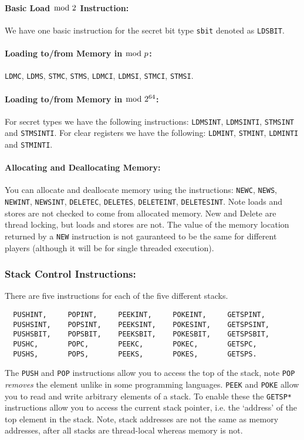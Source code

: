 \paragraph{Basic Load $\bmod \; 2$ Instruction:}
We have one basic instruction for the secret bit type \verb+sbit+ denoted as
\verb+LDSBIT+.

\paragraph{Loading to/from Memory in $\bmod \; p$:}
 \verb+LDMC+,
 \verb+LDMS+,
 \verb+STMC+,
 \verb+STMS+,
 \verb+LDMCI+,
 \verb+LDMSI+,
 \verb+STMCI+,
 \verb+STMSI+.

\paragraph{Loading to/from Memory in $\bmod \; 2^{64}$:}
For secret types we have the following instructions: \verb+LDMSINT+, \verb+LDMSINTI+, \verb+STMSINT+ and \verb+STMSINTI+. For clear registers we have the following: \verb+LDMINT+, \verb+STMINT+, \verb+LDMINTI+ and \verb+STMINTI+.

\paragraph{Allocating and Deallocating Memory:}
You can allocate and deallocate memory using the 
instructions:
  \verb+NEWC+,
  \verb+NEWS+,
  \verb+NEWINT+,
  \verb+NEWSINT+,
  \verb+DELETEC+,
  \verb+DELETES+,
  \verb+DELETEINT+,
  \verb+DELETESINT+.
Note loads and stores are not checked to come from allocated memory.
New and Delete are thread locking, but loads and stores are not.
The value of the memory location returned by a \verb|NEW| instruction
is not gauranteed to be the same for different players (although
it will be for single threaded execution).

\subsubsection{Stack Control Instructions:}
There are five instructions for each of the five different stacks.
\begin{verbatim}
  PUSHINT,     POPINT,     PEEKINT,     POKEINT,     GETSPINT,
  PUSHSINT,    POPSINT,    PEEKSINT,    POKESINT,    GETSPSINT,
  PUSHSBIT,    POPSBIT,    PEEKSBIT,    POKESBIT,    GETSPSBIT,
  PUSHC,       POPC,       PEEKC,       POKEC,       GETSPC,
  PUSHS,       POPS,       PEEKS,       POKES,       GETSPS.
\end{verbatim}
The \verb+PUSH+ and \verb+POP+ instructions allow you to access the top
of the stack, note \verb+POP+ {\em removes} the element unlike
in some programming languages.
\verb+PEEK+ and \verb+POKE+ allow you to read and write arbitrary elements
of a stack.
To enable these the \verb+GETSP*+ instructions allow you
to access the current stack pointer, i.e. the `address'
of the top element in the stack.
Note, stack addresses are not the same as memory addresses,
after all stacks are thread-local whereas memory is not.


